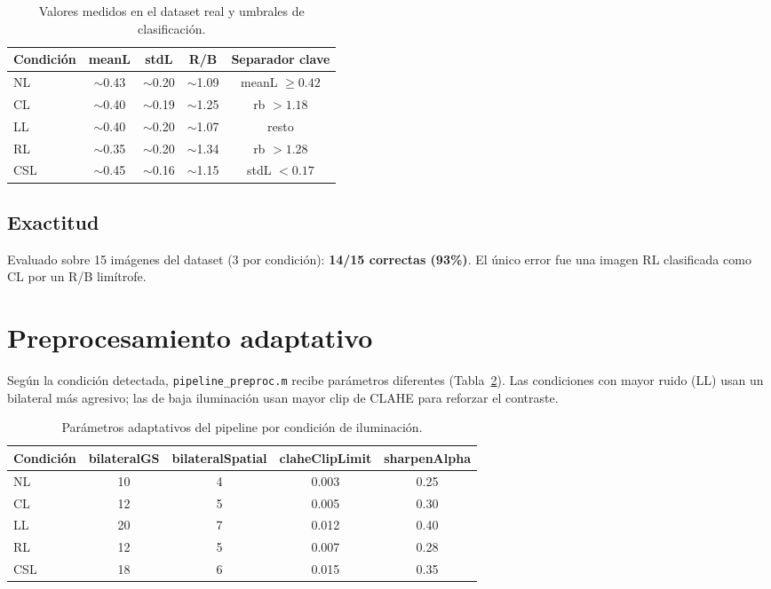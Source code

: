 \documentclass[11pt,a4paper]{article}
\begin{document}
\begin{table}[H]
\centering
\caption{Valores medidos en el dataset real y umbrales de clasificación.}
\label{tab:umbrales}
\begin{tabular}{@{}lcccc@{}}
\toprule
Condición & meanL & stdL & R/B & Separador clave \\
\midrule
NL  & $\sim$0.43 & $\sim$0.20 & $\sim$1.09 & meanL $\geq 0.42$ \\
CL  & $\sim$0.40 & $\sim$0.19 & $\sim$1.25 & rb $> 1.18$ \\
LL  & $\sim$0.40 & $\sim$0.20 & $\sim$1.07 & resto \\
RL  & $\sim$0.35 & $\sim$0.20 & $\sim$1.34 & rb $> 1.28$ \\
CSL & $\sim$0.45 & $\sim$0.16 & $\sim$1.15 & stdL $< 0.17$ \\
\bottomrule
\end{tabular}
\end{table}

\subsection{Exactitud}

Evaluado sobre 15 imágenes del dataset (3 por condición): \textbf{14/15 correctas
(93\%)}. El único error fue una imagen RL clasificada como CL por un R/B limítrofe.

\section{Preprocesamiento adaptativo}
\label{sec:preproc}

Según la condición detectada, \texttt{pipeline\_preproc.m} recibe parámetros
diferentes (Tabla~\ref{tab:adaptive}). Las condiciones con mayor ruido (LL) usan
un bilateral más agresivo; las de baja iluminación usan mayor clip de CLAHE para
reforzar el contraste.

\begin{table}[H]
\centering
\caption{Parámetros adaptativos del pipeline por condición de iluminación.}
\label{tab:adaptive}
\begin{tabular}{@{}lcccc@{}}
\toprule
Condición & bilateralGS & bilateralSpatial & claheClipLimit & sharpenAlpha \\
\midrule
NL  & 10 & 4 & 0.003 & 0.25 \\
CL  & 12 & 5 & 0.005 & 0.30 \\
LL  & 20 & 7 & 0.012 & 0.40 \\
RL  & 12 & 5 & 0.007 & 0.28 \\
CSL & 18 & 6 & 0.015 & 0.35 \\
\bottomrule
\end{tabular}
\end{table}
\end{document}
